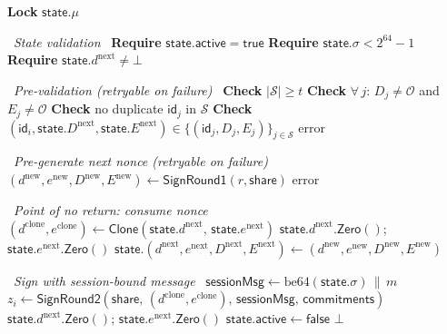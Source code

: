 \documentclass[11pt,a4paper]{article}
\newcommand{\id}{\mathsf{id}}
\begin{document}
\begin{algorithm}[H]
\caption{$\mathsf{PiggybackSign}(r,\, \mathsf{share},\, \mathsf{state},\,
  m,\, \{(\id_j, D_j, E_j)\}_{j \in \mathcal{S}})$}
\label{alg:piggyback-sign}
\begin{algorithmic}[1]
\State \textbf{Lock} $\mathsf{state}.\mu$

\Statex \hrulefill\ \textit{State validation}\ \hrulefill
\State \textbf{Require} $\mathsf{state}.\mathsf{active} = \mathsf{true}$
  \hfill {}
\State \textbf{Require} $\mathsf{state}.\sigma < 2^{64} - 1$
  \hfill {}
\State \textbf{Require} $\mathsf{state}.d^{\mathrm{next}} \ne \bot$

\Statex \hrulefill\ \textit{Pre-validation (retryable on failure)}\ \hrulefill
\State \textbf{Check} $|\mathcal{S}| \ge t$
\State \textbf{Check} $\forall\, j$: $D_j \ne \mathcal{O}$ and $E_j \ne \mathcal{O}$
\State \textbf{Check} no duplicate $\id_j$ in $\mathcal{S}$
\State \textbf{Check} $(\id_i, \mathsf{state}.D^{\mathrm{next}}, \mathsf{state}.E^{\mathrm{next}})
  \in \{(\id_j, D_j, E_j)\}_{j \in \mathcal{S}}$
 \Return error 
\EndIf

\Statex \hrulefill\ \textit{Pre-generate next nonce (retryable on failure)}\ \hrulefill
\State $(d^{\mathrm{new}}, e^{\mathrm{new}}, D^{\mathrm{new}}, E^{\mathrm{new}})
  \leftarrow \mathsf{SignRound1}(r, \mathsf{share})$
 \Return error 
\EndIf

\Statex \hrulefill\ \textit{Point of no return: consume nonce}\ \hrulefill
\State $(d^{\mathrm{clone}}, e^{\mathrm{clone}}) \leftarrow
  \mathsf{Clone}(\mathsf{state}.d^{\mathrm{next}},\,
  \mathsf{state}.e^{\mathrm{next}})$
\State $\mathsf{state}.d^{\mathrm{next}}.\mathsf{Zero}()$;\;
  $\mathsf{state}.e^{\mathrm{next}}.\mathsf{Zero}()$
\State $\mathsf{state}.(d^{\mathrm{next}}, e^{\mathrm{next}},
  D^{\mathrm{next}}, E^{\mathrm{next}}) \leftarrow
  (d^{\mathrm{new}}, e^{\mathrm{new}}, D^{\mathrm{new}}, E^{\mathrm{new}})$

\Statex \hrulefill\ \textit{Sign with session-bound message}\ \hrulefill
\State $\mathsf{sessionMsg} \leftarrow \mathrm{be64}(\mathsf{state}.\sigma) \,\|\, m$
\State $z_i \leftarrow \mathsf{SignRound2}(\mathsf{share},\,
  (d^{\mathrm{clone}}, e^{\mathrm{clone}}),\,
  \mathsf{sessionMsg},\, \mathsf{commitments})$
  \State $\mathsf{state}.d^{\mathrm{next}}.\mathsf{Zero}()$;\;
    $\mathsf{state}.e^{\mathrm{next}}.\mathsf{Zero}()$
  \State $\mathsf{state}.\mathsf{active} \leftarrow \mathsf{false}$
  \State \Return $\bot$
\EndIf


\end{algorithmic}
\end{algorithm}
\end{document}

